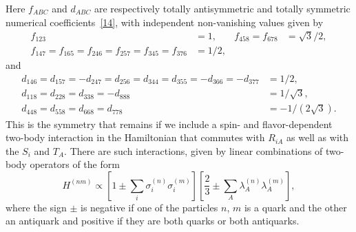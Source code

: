 Here $f_{ABC}$ and $d_{ABC}$ are respectively totally antisymmetric and totally
symmetric numerical coefficients~\hyperref[ch24-ref-14]{[14]}, with independent
non-vanishing values given by
\begin{equation}
\begin{aligned}
 f_{123}&=1,
 & f_{458}=f_{678}&=\sqrt{3}/2,
 \\
 f_{147}=f_{165}=f_{246}=f_{257}=f_{345}=f_{376}&=1/2,
\end{aligned}
\tag{24.A.4}\label{eq:24.A.4}
\end{equation}
and
\begin{equation}
\begin{aligned}
 d_{146}=d_{157}=-d_{247}=d_{256}=d_{344}=d_{355}
   =-d_{366}=-d_{377}&=1/2,
 \\
 d_{118}=d_{228}=d_{338}=-d_{888}&=1/\sqrt{3},
 \\
 d_{448}=d_{558}=d_{668}=d_{778}&=-1/(2\sqrt{3}).
\end{aligned}
\tag{24.A.5}\label{eq:24.A.5}
\end{equation}
This is the symmetry that remains if we include a spin- and flavor-dependent
two-body interaction in the Hamiltonian that commutes with $R_{iA}$ as well as
with the $S_i$ and $T_A$. There are such interactions, given by linear
combinations of two-body operators of the form
\begin{equation}
 H^{(nm)}\propto
 \left[1\mathbin{\pm}\sum_i\sigma_i^{(n)}\sigma_i^{(m)}\right]
 \left[\frac{2}{3}\mathbin{\pm}
 \sum_A\lambda_A^{(n)}\lambda_A^{(m)}\right],
 \tag{24.A.6}\label{eq:24.A.6}
\end{equation}
where the sign $\pm$ is negative if one of the particles $n$, $m$ is a quark
and the other an antiquark and positive if they are both quarks or both
antiquarks.

